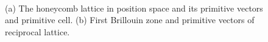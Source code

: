 \documentclass{article}
\begin{document}
\begin{figure}[h!]
     \centering
    \\
    \caption{(a) The honeycomb lattice in position space and its primitive vectors and primitive cell. (b) First Brillouin zone and primitive vectors of reciprocal lattice.}
    \label{fig:fig0}
\end{figure}
\end{document}
